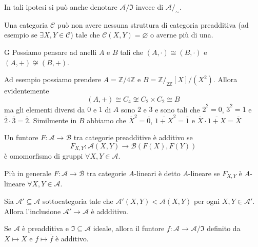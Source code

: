 In tali ipotesi si può anche denotare \(\mathcal{A} / \mathfrak{I}\) invece di
\(\mathcal{A}/_\sim\).

Una categoria \(\mathcal{C}\) può non avere nessuna struttura di categoria
    preadditiva (ad esempio se \(\exists X, Y \in \mathcal{C}\)) tale che \(\mathcal{C}{(X, Y)} = \varnothing\) o averne più di una.

\begin{example}{G}
    Possiamo pensare ad anelli \(A\) e \(B\) tali che \({(A, \cdot )} \cong {(B, \cdot )}\) e \({(A, +)} \not\cong {(B, +)}\).

    Ad esempio possiamo prendere \(A = \mathbb{Z} / 4 \mathbb{Z}\) e \(B = \mathbb{Z} /_{2 \mathbb{Z}} [X] / {(X^2)}\). Allora evidentemente 
    \[
      {(A, +)} \cong C_4 \not\cong C_{2} \times C_{2} \cong B
    \]
    ma gli elementi diversi da \(0\) e \(1\) di \(A\) sono \(\overline{2}\) e \(\overline{3}\) e sono tali che \(\overline{2}^2 = \overline{0}\), \(\overline{3}^2 = \overline{1}\) e \(\overline{2} \cdot \overline{3} = \overline{2}\). Similmente in \(B\) abbiamo che
    \(
      \overline{X}^2 = \overline{0}
    \), \(\overline{1+X}^2 = \overline{1}\) e \(\overline{X} \cdot \overline{1+X} = \overline{X}\)
\end{example}

\begin{definition}{}
    Un funtore \(F : \mathcal{A} \to \mathcal{B}\) tra categorie preadditive è
    additivo se 
    \[
      F_{X,Y}  : \mathcal{A}{(X, Y)} \to \mathcal{B}{(F{(X)}, F{(Y)})}
    \]
    è omomorfismo di gruppi \(\forall X, Y \in \mathcal{A}\).

    Più in generale \(F: \mathcal{A} \to \mathcal{B}\) tra categorie
    \(A\)-lineari è detto \(A\)-lineare se \(F_{X, Y} \) è \(A\)-lineare \(\forall X, Y \in \mathcal{A}\).
\end{definition}

\begin{example}{}
    Sia \(\mathcal{A}' \subseteq \mathcal{A} \) sottocategoria tale che \(\mathcal{A}'{(X, Y)} < \mathcal{A}{(X,Y)}\) per ogni \(X,Y \in \mathcal{A}'\). Allora l'inclusione \(\mathcal{A}' \to \mathcal{A}\) è addditivo.
\end{example}

\begin{example}{}
    Se \(\mathcal{A}\) è preadditiva e \(\mathfrak{I} \subseteq \mathcal{A} \)
    ideale, allora il funtore \(f : \mathcal{A} \to \mathcal{A}/\mathfrak{I}\) 
    definito da \(X \mapsto X\) e \(f \mapsto \overline{f}\) è additivo.
\end{example}

